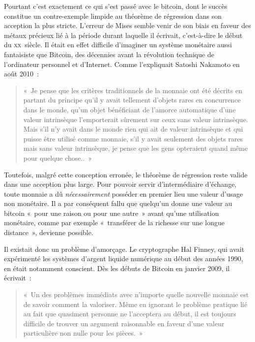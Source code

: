 Pourtant c'est exactement ce qui s'est passé avec le bitcoin, dont le succès constitue un contre-exemple limpide au théorème de régression dans son acception la plus stricte. L'erreur de Mises semble venir de son biais en faveur des métaux précieux lié à la période durant laquelle il écrivait, c'est-à-dire le début du \textsc{xx}\ieme{}~siècle. Il était en effet difficile d'imaginer un système monétaire aussi fantaisiste que Bitcoin, des décennies avant la révolution technique de l'ordinateur personnel et d'Internet. Comme l'expliquait Satoshi Nakamoto en août 2010~:

\begin{quote}
«~Je pense que les critères traditionnels de la monnaie ont été décrits en partant du principe qu'il y avait tellement d'objets rares en concurrence dans le monde, qu'un objet bénéficiant de l'amorce automatique d'une valeur intrinsèque l'emporterait sûrement sur ceux sans valeur intrinsèque. Mais s'il n'y avait dans le monde rien qui ait de valeur intrinsèque et qui puisse être utilisé comme monnaie, s'il y avait seulement des objets rares mais sans valeur intrinsèque, je pense que les gens opteraient quand même pour quelque chose..~»
\end{quote} 

Toutefois, malgré cette conception erronée, le théorème de régression reste valide dans une acception plus large. Pour pouvoir servir d'intermédiaire d'échange, toute monnaie a dû \emph{nécessairement} posséder en premier lieu une valeur d'usage non monétaire. Il a par conséquent fallu que quelqu'un donne une valeur au bitcoin «~pour une raison ou pour une autre~» avant qu'une utilisation monétaire, comme par exemple «~transférer de la richesse sur une longue distance~», devienne possible.

Il existait donc un problème d'amorçage. Le cryptographe Hal Finney, qui avait expérimenté les systèmes d'argent liquide numérique au début des années 1990, en était notamment conscient. Dès les débuts de Bitcoin en janvier 2009, il écrivait~: 

\begin{quote}
«~Un des problèmes immédiats avec n'importe quelle nouvelle monnaie est de savoir comment la valoriser. Même en ignorant le problème pratique lié au fait que quasiment personne ne l'acceptera au début, il est toujours difficile de trouver un argument raisonnable en faveur d'une valeur particulière non nulle pour les pièces.~»
\end{quote}

